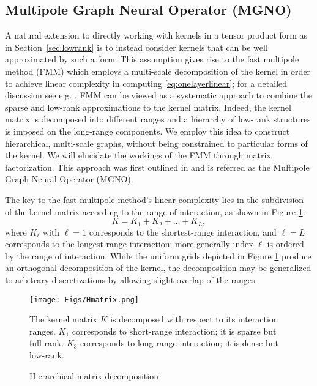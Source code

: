
\subsection{Multipole Graph Neural Operator (MGNO)}
\label{sec:multipole}
A natural extension to directly working with kernels in a tensor product form as in Section~\ref{sec:lowrank} is to instead consider kernels that can be well approximated by such a form. This assumption gives rise to the fast multipole method (FMM) which employs a multi-scale decomposition of the kernel in order to achieve linear complexity in computing \eqref{eq:onelayerlinear}; for a detailed discussion see e.g. \citep[Section 3.2]{e2011principles}. FMM can be viewed as a systematic approach to combine the sparse and low-rank approximations to the kernel matrix. Indeed, the kernel matrix is decomposed into different ranges and a hierarchy of low-rank structures is imposed on the long-range components.  We employ this idea to construct hierarchical, multi-scale graphs, without being constrained to particular forms of the kernel.  We will elucidate the workings of the FMM through matrix factorization.
This approach was first outlined in \cite{li2020multipole} and is referred as the Multipole Graph Neural Operator (MGNO).


The key to the fast multipole method's linear complexity lies in the subdivision of the kernel matrix according to the range of interaction, as shown in Figure \ref{fig:hmatrix}: 
\begin{equation}\label{eq:decomposition_matrix}
K = K_1 + K_2 + \ldots + K_L,
\end{equation}
where $K_\ell$ with $\ell=1$ corresponds to the shortest-range interaction, and $\ell=L$  corresponds to the longest-range interaction; more generally index $\ell$ is ordered by the
range of interaction. While the uniform grids depicted in Figure \ref{fig:hmatrix} produce an orthogonal decomposition of the kernel, the decomposition may be generalized to arbitrary discretizations  by allowing slight overlap of the ranges. 



\begin{figure}[h]
    {\centering
    \texttt{[image: Figs/Hmatrix.png]}
    \caption{Hierarchical matrix decomposition}
    \label{fig:hmatrix}
    \small{
    The kernel matrix $K$ is decomposed with respect to its interaction ranges. $K_1$ corresponds to short-range interaction; it is sparse but full-rank. $K_3$ corresponds to long-range interaction; it is dense but low-rank.
    }
    }
\end{figure}

